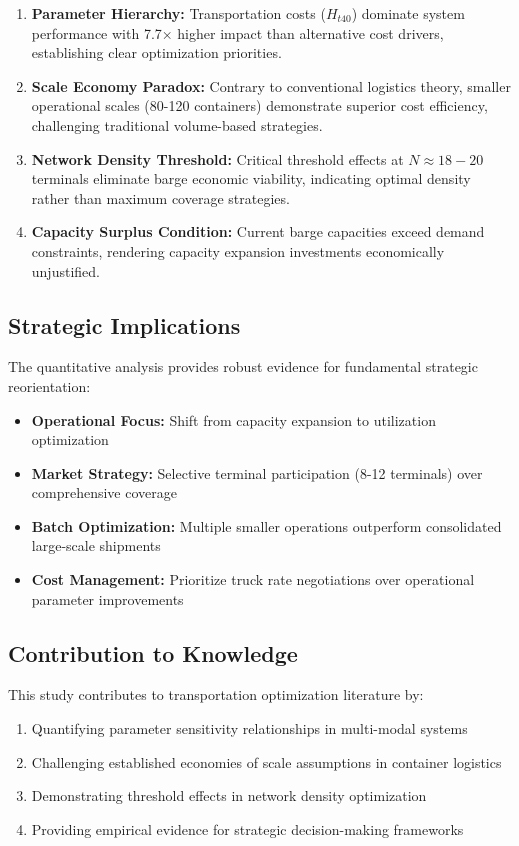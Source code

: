 \documentclass[12pt,a4paper]{article}
\begin{document}
\begin{enumerate}
    \item \textbf{Parameter Hierarchy:} Transportation costs ($H_{t40}$) dominate system performance with 7.7× higher impact than alternative cost drivers, establishing clear optimization priorities.
    
    \item \textbf{Scale Economy Paradox:} Contrary to conventional logistics theory, smaller operational scales (80-120 containers) demonstrate superior cost efficiency, challenging traditional volume-based strategies.
    
    \item \textbf{Network Density Threshold:} Critical threshold effects at $N \approx 18-20$ terminals eliminate barge economic viability, indicating optimal density rather than maximum coverage strategies.
    
    \item \textbf{Capacity Surplus Condition:} Current barge capacities exceed demand constraints, rendering capacity expansion investments economically unjustified.
\end{enumerate}

\subsection{Strategic Implications}

The quantitative analysis provides robust evidence for fundamental strategic reorientation:

\begin{itemize}
    \item \textbf{Operational Focus:} Shift from capacity expansion to utilization optimization
    \item \textbf{Market Strategy:} Selective terminal participation (8-12 terminals) over comprehensive coverage
    \item \textbf{Batch Optimization:} Multiple smaller operations outperform consolidated large-scale shipments
    \item \textbf{Cost Management:} Prioritize truck rate negotiations over operational parameter improvements
\end{itemize}

\subsection{Contribution to Knowledge}

This study contributes to transportation optimization literature by:
\begin{enumerate}
    \item Quantifying parameter sensitivity relationships in multi-modal systems
    \item Challenging established economies of scale assumptions in container logistics
    \item Demonstrating threshold effects in network density optimization
    \item Providing empirical evidence for strategic decision-making frameworks
\end{enumerate}
\end{document}
